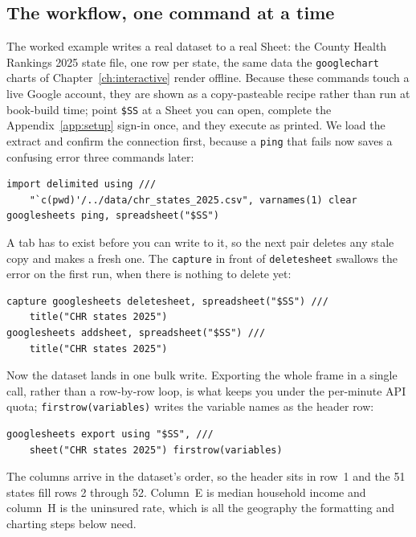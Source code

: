 \documentclass[
    a4paper,
    fontsize=10pt,
    twoside=true,
    numbers=noenddot,
]{kaobook}
\begin{document}
\subsection{The workflow, one command at a time}
The worked example writes a real dataset to a real Sheet: the County Health Rankings 2025 state file, one row per state, the same data the \texttt{googlechart} charts of Chapter~\ref{ch:interactive} render offline. Because these commands touch a live Google account, they are shown as a copy-pasteable recipe rather than run at book-build time; point \texttt{\$SS} at a Sheet you can open, complete the Appendix~\ref{app:setup} sign-in once, and they execute as printed. We load the extract and confirm the connection first, because a \texttt{ping} that fails now saves a confusing error three commands later:
{\footnotesize
\begin{verbatim}
import delimited using ///
    "`c(pwd)'/../data/chr_states_2025.csv", varnames(1) clear
googlesheets ping, spreadsheet("$SS")
\end{verbatim}
}
A tab has to exist before you can write to it, so the next pair deletes any stale copy and makes a fresh one. The \texttt{capture} in front of \texttt{deletesheet} swallows the error on the first run, when there is nothing to delete yet:
{\footnotesize
\begin{verbatim}
capture googlesheets deletesheet, spreadsheet("$SS") ///
    title("CHR states 2025")
googlesheets addsheet, spreadsheet("$SS") ///
    title("CHR states 2025")
\end{verbatim}
}
Now the dataset lands in one bulk write. Exporting the whole frame in a single call, rather than a row-by-row loop, is what keeps you under the per-minute API quota; \texttt{firstrow(variables)} writes the variable names as the header row:
{\footnotesize
\begin{verbatim}
googlesheets export using "$SS", ///
    sheet("CHR states 2025") firstrow(variables)
\end{verbatim}
}
The columns arrive in the dataset's order, so the header sits in row~1 and the 51 states fill rows 2 through 52. Column~E is median household income and column~H is the uninsured rate, which is all the geography the formatting and charting steps below need.
\end{document}
